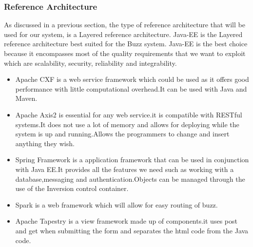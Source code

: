 \subsubsection{Reference Architecture}

As discussed in a previous section, the type of reference architecture that will be used for our system, is a Layered reference architecture.
Java-EE is the Layered reference architecture best suited for the Buzz system. Java-EE is the best choice
because it encompasses most of the quality requirements that we want to exploit which are scalability, security,
reliability and integrability.
\begin{itemize}
\item Apache CXF is a web service framework which could be used as it offers good performance with little computational overhead.It can be used with Java and Maven.
\item Apache Axis2 is essential for any web service.it is compatible with RESTful systems.It does not use a lot of memory and allows for deploying while the system is up and running.Allows the programmers to change and insert anything they wish.
\item Spring Framework is a application framework that can be used in conjunction with Java EE.It provides all the features we need such as working with a database,messaging and authentication.Objects can be managed through the use of the Inversion control container.
\item Spark is a web framework which will allow for easy routing of buzz.
\item Apache Tapestry is a view framework made up of components.it uses post and get when submitting the form and separates the html code from the Java code.
\end{itemize}